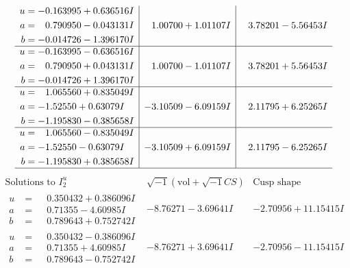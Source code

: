 \documentclass[1p]{elsarticle_modified}
\theoremstyle{definition}
\newcommand{\I}{\sqrt{-1}}
\begin{document}
$$\begin{array}{c|c|c}
\begin{aligned}
u &= -0.163995 + 0.636516 I \\
a &= \phantom{-}0.790950 - 0.043131 I \\
b &= -0.014726 - 1.396170 I\end{aligned}
 & \phantom{-}1.00700 + 1.01107 I & \phantom{-}3.78201 - 5.56453 I \\ \hline\begin{aligned}
u &= -0.163995 - 0.636516 I \\
a &= \phantom{-}0.790950 + 0.043131 I \\
b &= -0.014726 + 1.396170 I\end{aligned}
 & \phantom{-}1.00700 - 1.01107 I & \phantom{-}3.78201 + 5.56453 I \\ \hline\begin{aligned}
u &= \phantom{-}1.065560 + 0.835049 I \\
a &= -1.52550 + 0.63079 I \\
b &= -1.195830 - 0.385658 I\end{aligned}
 & -3.10509 - 6.09159 I & \phantom{-}2.11795 + 6.25265 I \\ \hline\begin{aligned}
u &= \phantom{-}1.065560 - 0.835049 I \\
a &= -1.52550 - 0.63079 I \\
b &= -1.195830 + 0.385658 I\end{aligned}
 & -3.10509 + 6.09159 I & \phantom{-}2.11795 - 6.25265 I\\
 \hline 
 \end{array}$$\newpage$$\begin{array}{c|c|c}  
\text{Solutions to }I^u_{2}& \I (\text{vol} + \sqrt{-1}CS) & \text{Cusp shape}\\
 \hline 
\begin{aligned}
u &= \phantom{-}0.350432 + 0.386096 I \\
a &= \phantom{-}0.71355 - 4.60985 I \\
b &= \phantom{-}0.789643 + 0.752742 I\end{aligned}
 & -8.76271 - 3.69641 I & -2.70956 + 11.15415 I \\ \hline\begin{aligned}
u &= \phantom{-}0.350432 - 0.386096 I \\
a &= \phantom{-}0.71355 + 4.60985 I \\
b &= \phantom{-}0.789643 - 0.752742 I\end{aligned}
 & -8.76271 + 3.69641 I & -2.70956 - 11.15415 I \\ \hline\begin{aligned}

\end{aligned}
\end{array}$$
\end{document}
